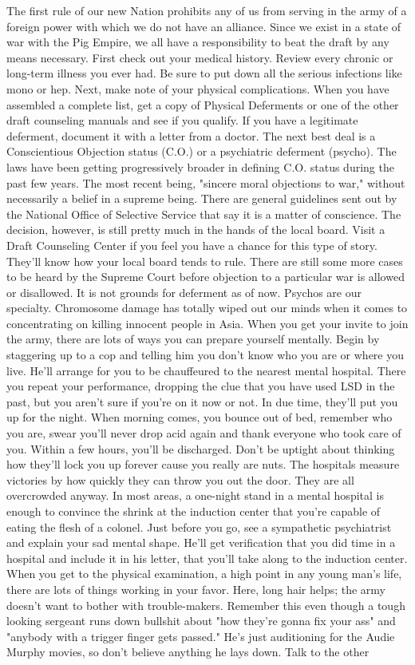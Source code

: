 \documentclass[11pt,twoside,a4paper]{book}
\begin{document}
The first rule of our new Nation prohibits any of us from serving in the army of a foreign power with which we do not have an alliance. Since we exist in a state of war with the Pig Empire, we all have a responsibility to beat the draft by any means necessary. First check out your medical history. Review every chronic or long-term illness you ever had. Be sure to put down all the serious infections like mono or hep. Next, make note of your physical complications. When you have assembled a complete list, get a copy of Physical Deferments or one of the other draft counseling manuals and see if you qualify. If you have a legitimate deferment, document it with a letter from a doctor. The next best deal is a Conscientious Objection status (C.O.) or a psychiatric deferment (psycho). The laws have been getting progressively broader in defining C.O. status during the past few years. The most recent being, "sincere moral objections to war," without necessarily a belief in a supreme being. There are general guidelines sent out by the National Office of Selective Service that say it is a matter of conscience. The decision, however, is still pretty much in the hands of the local board. Visit a Draft Counseling Center if you feel you have a chance for this type of story. They'll know how your local board tends to rule. There are still some more cases to be heard by the Supreme Court before objection to a particular war is allowed or disallowed. It is not grounds for deferment as of now. Psychos are our specialty. Chromosome damage has totally wiped out our minds when it comes to concentrating on killing innocent people in Asia. When you get your invite to join the army, there are lots of ways you can prepare yourself mentally. Begin by staggering up to a cop and telling him you don't know who you are or where you live. He'll arrange for you to be chauffeured to the nearest mental hospital. There you repeat your performance, dropping the clue that you have used LSD in the past, but you aren't sure if you're on it now or not. In due time, they'll put you up for the night. When morning comes, you bounce out of bed, remember who you are, swear you'll never drop acid again and thank everyone who took care of you. Within a few hours, you'll be discharged. Don't be uptight about thinking how they'll lock you up forever cause you really are nuts. The hospitals measure victories by how quickly they can throw you out the door. They are all overcrowded anyway. In most areas, a one-night stand in a mental hospital is enough to convince the shrink at the induction center that you're capable of eating the flesh of a colonel. Just before you go, see a sympathetic psychiatrist and explain your sad mental shape. He'll get verification that you did time in a hospital and include it in his letter, that you'll take along to the induction center. When you get to the physical examination, a high point in any young man's life, there are lots of things working in your favor. Here, long hair helps; the army doesn't want to bother with trouble-makers. Remember this even though a tough looking sergeant runs down bullshit about "how they're gonna fix your ass" and "anybody with a trigger finger gets passed." He's just auditioning for the Audie Murphy movies, so don't believe anything he lays down. Talk to the other 
\end{document}

